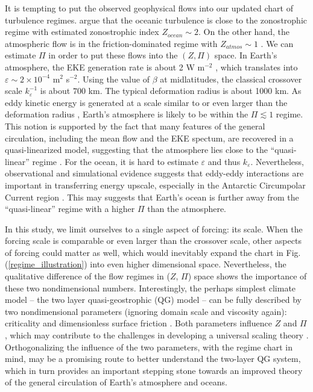 \documentclass{jfm}
\begin{document}
It is tempting to put the observed geophysical flows into our updated
chart of turbulence regimes. \citet{Galperin2004} argue that the
oceanic turbulence is close to the zonostrophic regime with estimated
zonostrophic index $Z_{ocean}\sim2$. On the other hand, the atmospheric
flow is in the friction-dominated regime with $Z_{atmos}\sim1$ \citep{Galperin2010}.
We can estimate $\Pi$ in order to put these flows into the $(Z,\Pi)$
space. In Earth's atmosphere, the EKE generation rate is about
2 W m$^{-2}$ \citep{Peixoto1984,Li2007}, which translates into $\varepsilon\sim2\times10^{-4}$
m$^{2}$ s$^{-2}$. Using the value of $\beta$ at midlatitudes, the
classical crossover scale $k_{\varepsilon}^{-1}$ is about $700$
km. The typical deformation radius is about 1000 km. As eddy kinetic
energy is generated at a scale similar to or even larger than the deformation
radius \citep{Chai2014}, Earth's atmosphere is likely to be within
the $\Pi\apprle1$ regime. This notion is supported by the fact that many features
of the general circulation, including the mean flow and the EKE spectum, 
are recovered in a quasi-linearized model, suggesting that  the atmosphere lies close
to the ``quasi-linear'' regime \citep{O'Gorman2007}. For the ocean,
it is hard to estimate $\varepsilon$ and thus $k_{\varepsilon}$. 
Nevertheless, observational and simulational evidence suggests that eddy-eddy
interactions are important in transferring energy upscale, especially in the Antarctic Circumpolar 
Current region \citep{Scott2005,Tulloch2011}. This may suggests that Earth's
ocean is further away from the ``quasi-linear'' regime with a higher $\Pi$ 
than the atmosphere.

In this study, we limit ourselves to a single aspect of forcing: its scale.
When the forcing scale is comparable or even larger than the crossover
scale, other aspects of forcing could matter as well, which would inevitably expand
the chart in Fig. (\ref{regime_illustration}) into even higher dimensional
space. Nevertheless, the qualitative difference of the flow regimes in
($Z$, $\Pi$) space shows the importance of these two nondimensional numbers.
Interestingly, the perhaps simplest climate model -- the two layer quasi-geostrophic
(QG) model -- can be fully described by two nondimensional parameters 
(ignoring domain scale and viscosity again): criticality and 
dimensionless surface friction \citep{Phillips1956,Held2019}. Both parameters
influence $Z$ and $\Pi$, which may contribute to the challenges in developing
a universal scaling theory \citep{Lapeyre2003,Thompson2007}. 
Orthogonalizing the influence of the two parameters, with the regime chart
in mind, may be a promising route to better understand the two-layer QG
system, which in turn provides an important stepping stone towards an
improved theory of the general circulation of Earth's atmosphere and oceans.
\end{document}
